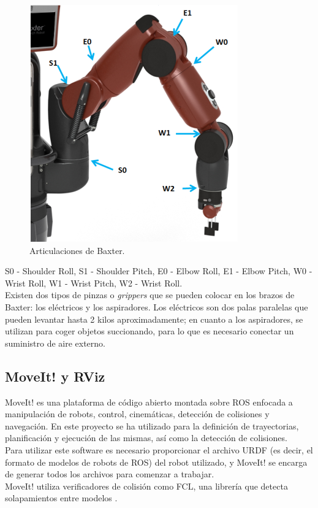 \begin{figure}[H]
	\centering %
	\includegraphics[scale=0.6]{imagenes/Baxter_arm.png}
	\caption{Articulaciones de Baxter.} \label{fig:arm}
\end{figure}

\noindent S0 - Shoulder Roll,
S1 - Shoulder Pitch,
E0 - Elbow Roll,
E1 - Elbow Pitch,
W0 - Wrist Roll,
W1 - Wrist Pitch,
W2 - Wrist Roll.\\

\noindent Existen dos tipos de pinzas o \textit{grippers} que se pueden colocar en los brazos de Baxter: los eléctricos y los aspiradores. Los eléctricos son dos palas paralelas que pueden levantar hasta 2 kilos aproximadamente; en cuanto a los aspiradores, se utilizan para coger objetos succionando, para lo que es necesario conectar un suministro de aire externo. \\


\subsection{MoveIt! y RViz}
\noindent MoveIt! \cite{moveit} es una plataforma de código abierto montada sobre ROS enfocada a manipulación de robots, control, cinemáticas, detección de colisiones y navegación. En este proyecto se ha utilizado para la definición de trayectorias, planificación y ejecución de las mismas, así como la detección de colisiones.\\
\noindent Para utilizar este software es necesario proporcionar el archivo URDF (es decir, el formato de modelos de robots de ROS) del robot utilizado, y MoveIt! se encarga de generar todos los archivos para comenzar a trabajar. \\
\noindent MoveIt! utiliza verificadores de colisión como FCL, una librería que detecta solapamientos entre modelos \cite{moveitfaq}. \\

